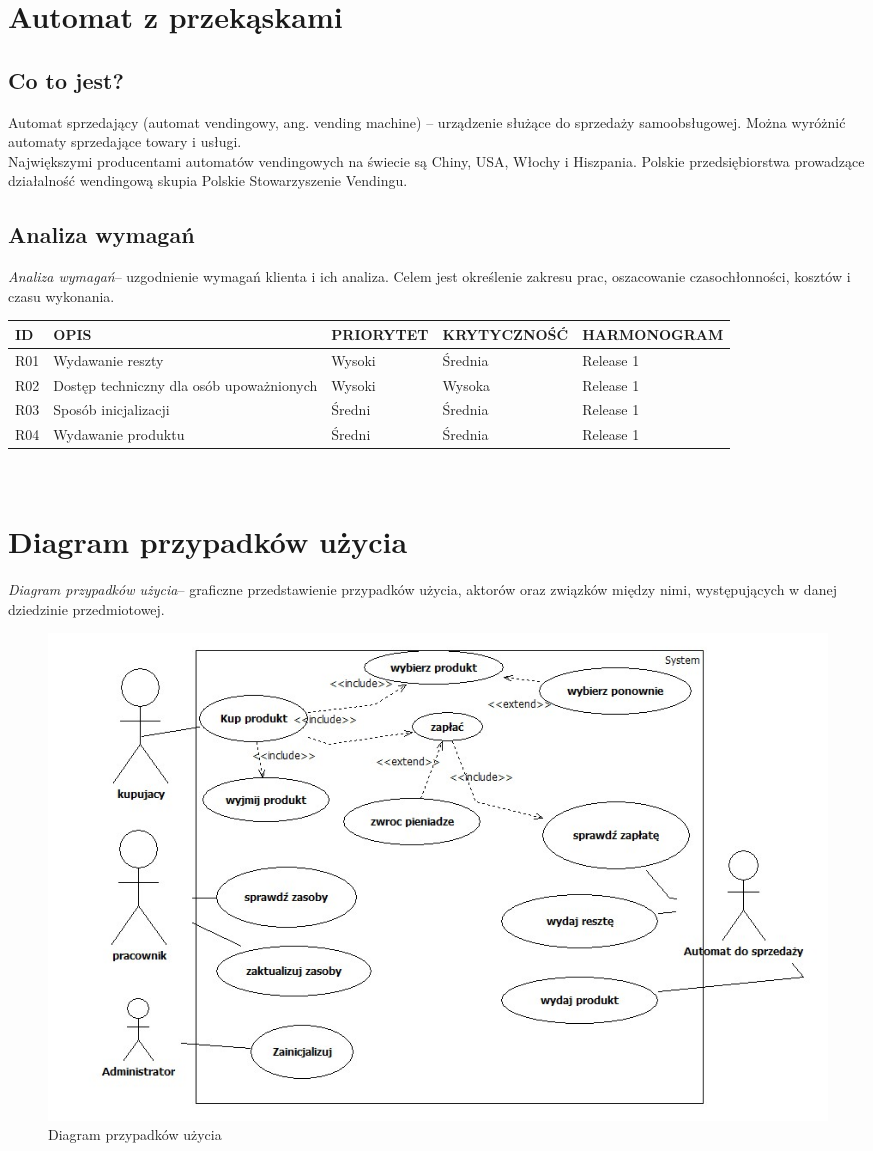 \documentclass[a4paper, 11pt]{article}
\begin{document}
\section{Automat z przekąskami }
\subsection{Co to jest?}
 Automat sprzedający (automat vendingowy, ang. vending machine) – urządzenie służące do sprzedaży samoobsługowej. Można wyróżnić automaty sprzedające towary i usługi.\\
 Największymi producentami automatów vendingowych na świecie są Chiny, USA, Włochy i Hiszpania.
 Polskie przedsiębiorstwa prowadzące działalność wendingową skupia Polskie Stowarzyszenie Vendingu.
\subsection{Analiza wymagań}
\emph{Analiza wymagań}– uzgodnienie wymagań klienta i ich analiza. Celem jest określenie zakresu prac, oszacowanie czasochłonności, kosztów i czasu wykonania.\\[1cm] 
\begin{tabular}{|l|p{3.5cm}|l|l|l|} \hline
ID  & OPIS & PRIORYTET & KRYTYCZNOŚĆ & HARMONOGRAM \\ \hline
R01 & Wydawanie reszty & Wysoki & Średnia & Release 1\\ \hline
R02 & Dostęp techniczny dla osób upoważnionych & Wysoki & Wysoka & Release 1 \\ \hline
R03 & Sposób inicjalizacji & Średni & Średnia & Release 1\\ \hline
R04 & Wydawanie produktu & Średni & Średnia & Release 1 \\ \hline
\end{tabular}\\


\newpage
\section{Diagram przypadków użycia}
\emph{Diagram przypadków użycia}– graficzne przedstawienie przypadków użycia, aktorów oraz związków między nimi, występujących w danej dziedzinie przedmiotowej.
\begin{figure}[ht]
\centerline{\includegraphics[scale=0.6]{uzycia}}
\caption{Diagram przypadków użycia}
\end{figure}%
\end{document}
